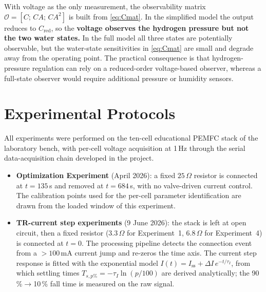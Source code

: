 With voltage as the only measurement, the observability matrix
$\mathcal{O}=[C;\,CA;\,CA^2]$ is built from \eqref{eq:Cmat}. In the simplified
model the output reduces to $C_{\text{red}}$, so the
\textbf{voltage observes the hydrogen pressure but not the two water states.}
In the full model all three states are potentially observable, but the
water-state sensitivities in \eqref{eq:Cmat} are small and degrade away from the
operating point. The practical consequence is that hydrogen-pressure regulation
can rely on a reduced-order voltage-based observer, whereas a full-state observer
would require additional pressure or humidity sensors.

\section{Experimental Protocols}
\label{sec:protocols}

All experiments were performed on the ten-cell educational PEMFC stack of the
laboratory bench, with per-cell voltage acquisition at 1\,Hz through the serial
data-acquisition chain developed in the project.
\begin{itemize}
    \item \textbf{Optimization Experiment} (April 2026): a fixed $25\,\Omega$
          resistor is connected at $t=135$\,s and removed at $t=684$\,s, with no
          valve-driven current control. The calibration points used for the
          per-cell parameter identification are drawn from the loaded window of
          this experiment.
    \item \textbf{TR-current step experiments} (9 June 2026): the stack is left at
          open circuit, then a fixed resistor ($3.3\,\Omega$ for Experiment~1,
          $6.8\,\Omega$ for Experiment~4) is connected at $t=0$. The processing
          pipeline detects the connection event from a $>100$\,mA current jump and
          re-zeros the time axis. The current step response is fitted with the
          exponential model
          $I(t)=I_{\text{ss}}+\Delta I\,e^{-t/\tau_I}$, from which settling times
          $T_{s,p\%}=-\tau_I\ln(p/100)$ are derived analytically; the
          90\,\%$\to$10\,\% fall time is measured on the raw signal.
\end{itemize}
